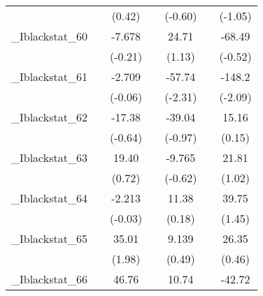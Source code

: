 {\begin{tabular}{l*{6}{c}}
            &                     &      (0.42)         &                     &     (-0.60)         &                     &     (-1.05)         \\
[1em]
\_Iblackstat\_60&                     &      -7.678         &                     &       24.71         &                     &      -68.49         \\
            &                     &     (-0.21)         &                     &      (1.13)         &                     &     (-0.52)         \\
[1em]
\_Iblackstat\_61&                     &      -2.709         &                     &      -57.74\sym{*}  &                     &      -148.2\sym{*}  \\
            &                     &     (-0.06)         &                     &     (-2.31)         &                     &     (-2.09)         \\
[1em]
\_Iblackstat\_62&                     &      -17.38         &                     &      -39.04         &                     &       15.16         \\
            &                     &     (-0.64)         &                     &     (-0.97)         &                     &      (0.15)         \\
[1em]
\_Iblackstat\_63&                     &       19.40         &                     &      -9.765         &                     &       21.81         \\
            &                     &      (0.72)         &                     &     (-0.62)         &                     &      (1.02)         \\
[1em]
\_Iblackstat\_64&                     &      -2.213         &                     &       11.38         &                     &       39.75         \\
            &                     &     (-0.03)         &                     &      (0.18)         &                     &      (1.45)         \\
[1em]
\_Iblackstat\_65&                     &       35.01         &                     &       9.139         &                     &       26.35         \\
            &                     &      (1.98)         &                     &      (0.49)         &                     &      (0.46)         \\
[1em]
\_Iblackstat\_66&                     &       46.76         &                     &       10.74         &                     &      -42.72         \\

\end{tabular}}
